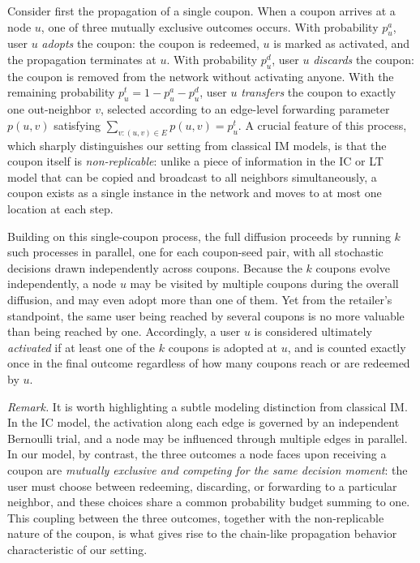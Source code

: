 \documentclass{article}
\begin{document}
Consider first the propagation of a single coupon. When a coupon arrives at a node $u$, one of three mutually exclusive outcomes occurs. With probability $p_u^a$, user $u$ \emph{adopts} the coupon: the coupon is redeemed, $u$ is marked as activated, and the propagation terminates at $u$. With probability $p_u^d$, user $u$ \emph{discards} the coupon: the coupon is removed from the network without activating anyone. With the remaining probability $p_u^t = 1 - p_u^a - p_u^d$, user $u$ \emph{transfers} the coupon to exactly one out-neighbor $v$, selected according to an edge-level forwarding parameter $p(u, v)$ satisfying $\sum_{v: (u, v) \in E} p(u, v) = p_u^t$. A crucial feature of this process, which sharply distinguishes our setting from classical IM models, is that the coupon itself is \emph{non-replicable}: unlike a piece of information in the IC or LT model that can be copied and broadcast to all neighbors simultaneously, a coupon exists as a single instance in the network and moves to at most one location at each step.

Building on this single-coupon process, the full diffusion proceeds by running $k$ such processes in parallel, one for each coupon-seed pair, with all stochastic decisions drawn independently across coupons. Because the $k$ coupons evolve independently, a node $u$ may be visited by multiple coupons during the overall diffusion, and may even adopt more than one of them. Yet from the retailer's standpoint, the same user being reached by several coupons is no more valuable than being reached by one. Accordingly, a user $u$ is considered ultimately \emph{activated} if at least one of the $k$ coupons is adopted at $u$, and is counted exactly once in the final outcome regardless of how many coupons reach or are redeemed by $u$.

\textit{Remark.} It is worth highlighting a subtle modeling distinction from classical IM. In the IC model, the activation along each edge is governed by an independent Bernoulli trial, and a node may be influenced through multiple edges in parallel. In our model, by contrast, the three outcomes a node faces upon receiving a coupon are \emph{mutually exclusive and competing for the same decision moment}: the user must choose between redeeming, discarding, or forwarding to a particular neighbor, and these choices share a common probability budget summing to one. This coupling between the three outcomes, together with the non-replicable nature of the coupon, is what gives rise to the chain-like propagation behavior characteristic of our setting.
\end{document}
